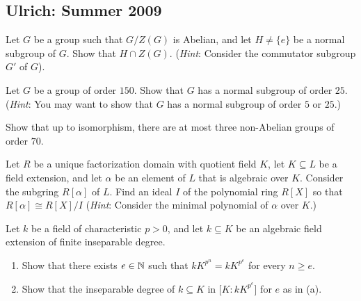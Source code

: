 \subsection{Ulrich: Summer 2009}
\setcounter{exercise}{0}
\setcounter{equation}{0}

\begin{problem}
  Let \(G\) be a group such that \(G/Z(G)\) is Abelian, and let
  \(H\neq\{e\}\) be a normal subgroup of \(G\). Show that \(H\cap
  Z(G)\). (\emph{Hint}: Consider  the commutator subgroup \(G'\) of
  \(G\)).
\end{problem}
\begin{solution}
\end{solution}

\begin{problem}
  Let \(G\) be a group of order \(150\). Show that \(G\) has a normal
  subgroup of order \(25\). (\emph{Hint}: You may want to show that \(G\)
  has a normal subgroup of order \(5\) or \(25\).)
\end{problem}
\begin{solution}
\end{solution}

\begin{problem}
  Show that up to isomorphism, there are at most three non-Abelian groups
  of order \(70\).
\end{problem}
\begin{solution}
\end{solution}

\begin{problem}
  Let \(R\) be a unique factorization domain with quotient field \(K\), let
  \(K\subseteq L\) be a field extension, and let \(\alpha\) be an element
  of \(L\) that is algebraic over \(K\). Consider the subgring
  \(R[\alpha]\) of \(L\). Find an ideal \(I\) of the polynomial ring
  \(R[X]\) so that \(R[\alpha]\cong R[X]/I\) (\emph{Hint}: Consider the
  minimal polynomial of \(\alpha\) over \(K\).)
\end{problem}
\begin{solution}
\end{solution}

\begin{problem}
  Let \(k\) be a field of characteristic \(p>0\), and let \(k\subseteq K\)
  be an algebraic field extension of finite inseparable degree.
  \begin{enumerate}[label=(\alph*)]
  \item Show that there exists \(e\in\mathbb{N}\) such that \(kK^{p^n}=kK^{p^e}\)
    for every \(n\geq e\).
  \item Show that the inseparable degree of \(k\subseteq K\) in
    \(\bigl[K:kK^{p^e}\bigr]\) for \(e\) as in (a).
  \end{enumerate}
\end{problem}
\begin{solution}
\end{solution}

